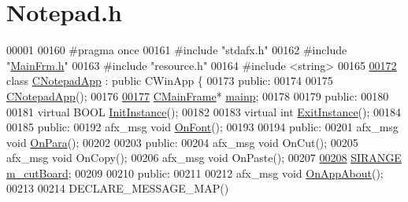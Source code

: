 \hypertarget{_notepad_8h_source}{}\section{Notepad.\+h}
\label{_notepad_8h_source}

\begin{DoxyCode}
00001 
00160 \textcolor{preprocessor}{#pragma once}
00161 \textcolor{preprocessor}{#include "stdafx.h"}
00162 \textcolor{preprocessor}{#include "\hyperlink{_main_frm_8h}{MainFrm.h}"}
00163 \textcolor{preprocessor}{#include "resource.h"}
00164 \textcolor{preprocessor}{#include <string>}
00165 
\hyperlink{class_c_notepad_app}{00172} \textcolor{keyword}{class }\hyperlink{class_c_notepad_app}{CNotepadApp} : \textcolor{keyword}{public} CWinApp \{
00173 \textcolor{keyword}{public}:
00174 
00175     \hyperlink{class_c_notepad_app_a829ed77997eb81496b815b50657ecb40}{CNotepadApp}();
00176 
\hyperlink{class_c_notepad_app_a9eee0a246d98c97f2554d5bd292bf3f1}{00177}     \hyperlink{class_c_main_frame}{CMainFrame}* \hyperlink{class_c_notepad_app_a9eee0a246d98c97f2554d5bd292bf3f1}{mainp};
00178 
00179 \textcolor{keyword}{public}:
00180 
00181     \textcolor{keyword}{virtual} BOOL \hyperlink{class_c_notepad_app_a31874d4fcf2e5120379146e61d8716d4}{InitInstance}();
00182 
00183     \textcolor{keyword}{virtual} \textcolor{keywordtype}{int} \hyperlink{class_c_notepad_app_a07647790b646bc0be54fbf39e069ddcd}{ExitInstance}();
00184 
00185 \textcolor{keyword}{public}:
00192     afx\_msg \textcolor{keywordtype}{void} \hyperlink{class_c_notepad_app_aa09334de95a65c56cdca8a682b006bb6}{OnFont}();
00193 
00194 \textcolor{keyword}{public}:
00201     afx\_msg \textcolor{keywordtype}{void} \hyperlink{class_c_notepad_app_a954649ecbb87fb8a001f2ed399440261}{OnPara}();
00202 
00203 \textcolor{keyword}{public}:
00204     afx\_msg \textcolor{keywordtype}{void} OnCut();
00205     afx\_msg \textcolor{keywordtype}{void} OnCopy();
00206     afx\_msg \textcolor{keywordtype}{void} OnPaste();
00207 
\hyperlink{class_c_notepad_app_a7659b246dc9d6690527694f35d31416f}{00208}     \hyperlink{struct_s_i_r_a_n_g_e}{SIRANGE} \hyperlink{class_c_notepad_app_a7659b246dc9d6690527694f35d31416f}{m\_cutBoard}; 
00209 
00210 \textcolor{keyword}{public}:
00211 
00212     afx\_msg \textcolor{keywordtype}{void} \hyperlink{class_c_notepad_app_a40ce59e5a4884458f47b49b80497683a}{OnAppAbout}();
00213 
00214     DECLARE\_MESSAGE\_MAP()

\end{DoxyCode}

